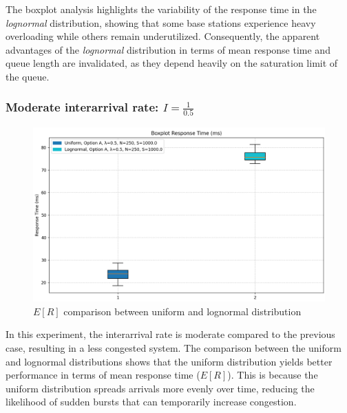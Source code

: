 \documentclass{report}
\begin{document}
\begin{flushleft}
The boxplot analysis highlights the variability of the response time in the \emph{lognormal} distribution, showing that some base stations experience heavy overloading while others remain underutilized. Consequently, the apparent advantages of the \emph{lognormal} distribution in terms of mean response time and queue length are invalidated, as they depend heavily on the saturation limit of the queue.

\end{flushleft}

\vspace{10mm}

\subsubsection*{Moderate interarrival rate: $I = \frac{1}{0.5}$} 

\begin{figure}[H] 
    \centering 
    \includegraphics[width=\textwidth]{img/plots/I-vary/R_Box_A_I05.png} \caption{$E[R]$ comparison between uniform and lognormal distribution}
\end{figure}

In this experiment, the interarrival rate is moderate compared to the previous case, resulting in a less congested system.
The comparison between the uniform and lognormal distributions shows that the uniform distribution yields better performance in terms of mean response time ($E[R]$).
This is because the uniform distribution spreads arrivals more evenly over time, reducing the likelihood of sudden bursts that can temporarily increase congestion.
\end{document}
